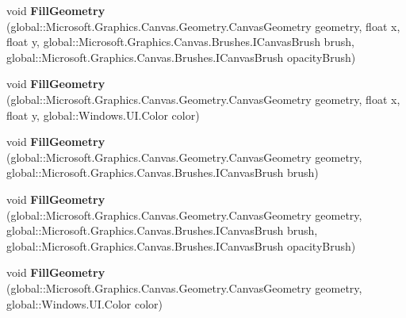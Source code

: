 \begin{DoxyCompactItemize}
\item 
\mbox{\label{interface_microsoft_1_1_graphics_1_1_canvas_1_1_i_canvas_drawing_session_a20a20425b22d291b0f3ac5321f4fe94b}} 
void {\bfseries Fill\+Geometry} (global\+::\+Microsoft.\+Graphics.\+Canvas.\+Geometry.\+Canvas\+Geometry geometry, float x, float y, global\+::\+Microsoft.\+Graphics.\+Canvas.\+Brushes.\+I\+Canvas\+Brush brush, global\+::\+Microsoft.\+Graphics.\+Canvas.\+Brushes.\+I\+Canvas\+Brush opacity\+Brush)
\item 
\mbox{\label{interface_microsoft_1_1_graphics_1_1_canvas_1_1_i_canvas_drawing_session_a61fd27d6b54bd2bc5830cd97e2fb1d56}} 
void {\bfseries Fill\+Geometry} (global\+::\+Microsoft.\+Graphics.\+Canvas.\+Geometry.\+Canvas\+Geometry geometry, float x, float y, global\+::\+Windows.\+U\+I.\+Color color)
\item 
\mbox{\label{interface_microsoft_1_1_graphics_1_1_canvas_1_1_i_canvas_drawing_session_a59718abae37d2999f8b8d732bc47b49f}} 
void {\bfseries Fill\+Geometry} (global\+::\+Microsoft.\+Graphics.\+Canvas.\+Geometry.\+Canvas\+Geometry geometry, global\+::\+Microsoft.\+Graphics.\+Canvas.\+Brushes.\+I\+Canvas\+Brush brush)
\item 
\mbox{\label{interface_microsoft_1_1_graphics_1_1_canvas_1_1_i_canvas_drawing_session_aad80be604383ba24523e811f528a8557}} 
void {\bfseries Fill\+Geometry} (global\+::\+Microsoft.\+Graphics.\+Canvas.\+Geometry.\+Canvas\+Geometry geometry, global\+::\+Microsoft.\+Graphics.\+Canvas.\+Brushes.\+I\+Canvas\+Brush brush, global\+::\+Microsoft.\+Graphics.\+Canvas.\+Brushes.\+I\+Canvas\+Brush opacity\+Brush)
\item 
\mbox{\label{interface_microsoft_1_1_graphics_1_1_canvas_1_1_i_canvas_drawing_session_a0ab422e59e3ff023bff47973b32cdc37}} 
void {\bfseries Fill\+Geometry} (global\+::\+Microsoft.\+Graphics.\+Canvas.\+Geometry.\+Canvas\+Geometry geometry, global\+::\+Windows.\+U\+I.\+Color color)
\item 

\end{DoxyCompactItemize}
